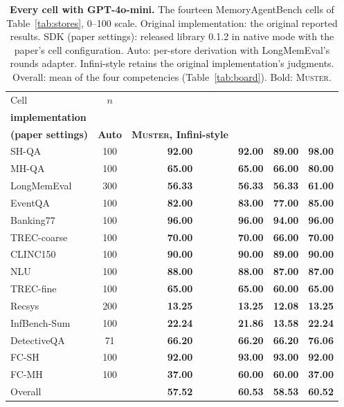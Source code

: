 \documentclass{article}
\newcommand{\tabfont}{\fontsize{7.5}{8.5}\selectfont\renewcommand{\arraystretch}{1.0}}
\newcommand{\sys}{\textsc{Muster}}
\begin{document}
\begin{table}[!htbp]
\centering\tabfont
\caption{\textbf{Every cell with GPT-4o-mini.} The fourteen MemoryAgentBench cells of Table~\ref{tab:stores}, 0--100 scale. Original implementation: the original reported results. SDK (paper settings): released library 0.1.2 in native mode with the paper's cell configuration. Auto: per-store derivation with LongMemEval's rounds adapter. Infini-style retains the original implementation's judgments. Overall: mean of the four competencies (Table~\ref{tab:board}). Bold: \sys{}.}
\label{tab:expanded4o-mini}
\setlength{\tabcolsep}{4pt}\setlength{\aboverulesep}{0pt}\setlength{\belowrulesep}{0pt}\setlength{\extrarowheight}{0.8pt}
\begin{tabular}{lc>{\columncolor{oursbg}}c>{\columncolor{oursbg}}c>{\columncolor{oursbg}}c>{\columncolor{oursbg}}c}
\toprule
Cell & $n$ & \shortstack{\textbf{Original}\\\textbf{implementation}} & \shortstack{\textbf{SDK}\\\textbf{(paper settings)}} & \textbf{Auto} & \textbf{\sys{}, Infini-style} \\
\midrule
SH-QA & 100 & \textbf{92.00} & \textbf{92.00} & \textbf{89.00} & \textbf{98.00} \\
MH-QA & 100 & \textbf{65.00} & \textbf{65.00} & \textbf{66.00} & \textbf{80.00} \\
LongMemEval & 300 & \textbf{56.33} & \textbf{56.33} & \textbf{56.33} & \textbf{61.00} \\
EventQA & 100 & \textbf{82.00} & \textbf{83.00} & \textbf{77.00} & \textbf{85.00} \\
Banking77 & 100 & \textbf{96.00} & \textbf{96.00} & \textbf{94.00} & \textbf{96.00} \\
TREC-coarse & 100 & \textbf{70.00} & \textbf{70.00} & \textbf{66.00} & \textbf{70.00} \\
CLINC150 & 100 & \textbf{90.00} & \textbf{90.00} & \textbf{89.00} & \textbf{90.00} \\
NLU & 100 & \textbf{88.00} & \textbf{88.00} & \textbf{87.00} & \textbf{87.00} \\
TREC-fine & 100 & \textbf{65.00} & \textbf{65.00} & \textbf{60.00} & \textbf{65.00} \\
Recsys & 200 & \textbf{13.25} & \textbf{13.25} & \textbf{12.08} & \textbf{13.25} \\
InfBench-Sum & 100 & \textbf{22.24} & \textbf{21.86} & \textbf{13.58} & \textbf{22.24} \\
DetectiveQA & 71 & \textbf{66.20} & \textbf{66.20} & \textbf{66.20} & \textbf{76.06} \\
FC-SH & 100 & \textbf{92.00} & \textbf{93.00} & \textbf{93.00} & \textbf{92.00} \\
FC-MH & 100 & \textbf{37.00} & \textbf{60.00} & \textbf{60.00} & \textbf{37.00} \\
\midrule
Overall &  & \textbf{57.52} & \textbf{60.53} & \textbf{58.53} & \textbf{60.52} \\
\bottomrule
\end{tabular}
\end{table}
\end{document}
